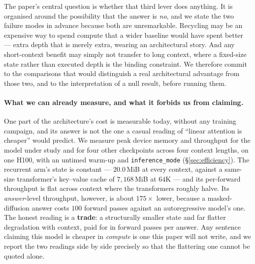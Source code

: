 \documentclass[11pt]{article}
\begin{document}
The paper's central question is whether that third lever does anything. It is organised
around the possibility that the answer is \emph{no}, and we state the two failure modes in
advance because both are unremarkable. Recycling may be an expensive way to spend compute
that a wider baseline would have spent better --- extra depth that is merely extra, wearing
an architectural story. And any short-context benefit may simply not transfer to long
context, where a fixed-size state rather than executed depth is the binding constraint. We
therefore commit to the comparisons that would distinguish a real architectural advantage
from those two, and to the interpretation of a null result, before running them.

\paragraph{What we can already measure, and what it forbids us from claiming.} One part of
the architecture's cost is measurable today, without any training campaign, and its answer
is not the one a casual reading of ``linear attention is cheaper'' would predict. We measure
peak device memory and throughput for the model under study and for four other checkpoints
across four context lengths, on one H100, with an untimed warm-up and \texttt{inference\_mode}
(\S\ref{sec:efficiency}). The recurrent arm's state is constant --- $20.0$\,MiB at every
context, against a same-size transformer's key--value cache of $7{,}168$\,MiB at $64$K ---
and its per-forward throughput is flat across context where the transformers roughly halve.
Its \emph{answer}-level throughput, however, is about $175\times$ lower, because a
masked-diffusion answer costs $100$ forward passes against an autoregressive model's one.
The honest reading is a \textbf{trade}: a structurally smaller state and far flatter
degradation with context, paid for in forward passes per answer. Any sentence claiming this
model is cheaper in \emph{compute} is one this paper will not write, and we report the two
readings side by side precisely so that the flattering one cannot be quoted alone.
\end{document}
